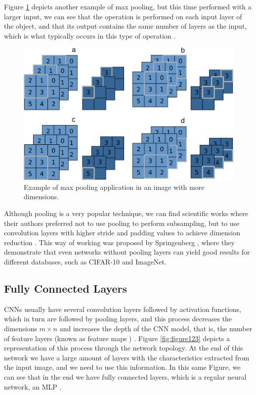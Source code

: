 Figure \ref{fig:figure122} depicts another example of max pooling, but this time performed with a larger input, we can see that the operation is performed on each input layer of the object, and that its output contains the same number of layers as the input, which is what typically occurs in this type of operation \cite{geron2019}.

\begin{figure}
    \centering
    \includegraphics[scale=0.30]{Part 3 - Learning Systems/Supervised Learning/Deep Learning/images/figure122.png}
    \caption{Example of max pooling application in an image with more dimensions.}
    \label{fig:figure122}
\end{figure}

Although pooling is a very popular technique, we can find scientific works where their authors preferred not to use pooling to perform subsampling, but to use convolution layers with higher stride and padding values to achieve dimension reduction \cite{elgendy2020}\cite{adrian2017}. This way of working was proposed by Springenberg \cite{springenberg2014striving}, where they demonstrate that even networks without pooling layers can yield good results for different databases, such as CIFAR-10 and ImageNet.

\subsection{Fully Connected Layers}

CNNs usually have several convolution layers followed by activation functions, which in turn are followed by pooling layers, and this process decreases the dimensions $m \times n$ and increases the depth of the CNN model, that is, the number of feature layers (known as feature maps ) \cite{elgendy2020}\cite{geron2019}. Figure \ref{fig:figure123} depicts a representation of this process through the network topology. At the end of this network we have a large amount of layers with the characteristics extracted from the input image, and we need to use this information. In this same Figure, we can see that in the end we have fully connected layers, which is a regular neural network, an MLP \cite{elgendy2020}.

